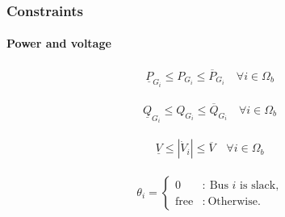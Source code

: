 \documentclass[
	11pt, %
	aspectratio=169, %
]{beamer}
\begin{document}
\begin{frame}
	\frametitle{Constraints}
	\framesubtitle{Power and voltage} %

	\begin{align}
	\label{eq:cons_power_P}
		\underline{P}_{G_{i}} \leq P_{G_{i}} \leq \overline{P}_{G_{i}}  \quad \forall i \in \Omega_{b}
	\end{align}

	\begin{align}
	\label{eq:cons_power_Q}
		\underline{Q}_{G_{i}} \leq Q_{G_{i}} \leq \overline{Q}_{G_{i}}  \quad \forall i \in \Omega_{b}
	\end{align}

	\begin{align}
	\label{eq:cons_voltage}
		\underline{V} \leq \left|\dot{V}_{i} \right| \leq \overline{V}  \quad \forall i \in \Omega_{b}
	\end{align}

	\begin{align}
	\label{eq:cons_slack}
		\theta_{i} = \left\{ \begin{array}{cl}
							0 & : \ \text{Bus } i \text{ is slack,} \\
							\text{free} & : \ \text{Otherwise.}
							\end{array} \right.\\
	\end{align}

	
\end{frame}

\end{document}
